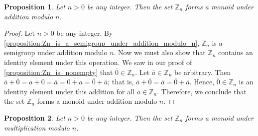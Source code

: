 \documentclass[12pt, titlepage]{amsart}
\newcommand\Z{{\mathbb Z}}
\newtheorem{prop}{Proposition}[subsection]
\theoremstyle{definition}
\begin{document}
	\begin{prop}\label{proposition:Zn_is_a_monoid_under_addition}
		Let $n>0$ be any integer. Then the set $\Z_n$ forms a monoid under addition modulo $n$.
	\end{prop}
	
	\begin{proof}
		Let $n>0$ be any integer.
		By \cref{proposition:Zn_is_a_semigroup_under_addition_modulo_n}, $\Z_n$ is a semigroup under addition modulo $n$.
		Now we must also show that $\Z_n$ contains an identity element under this operation.
		We saw in our proof of \cref{proposition:Zn_is_nonempty} that $\bar{0} \in \Z_n$.
		Let $\bar{a} \in \Z_n$ be arbitrary.
		Then $\bar{a} + \bar{0} = \overline{a + 0} = \bar{a} = \overline{0 + a} = \bar{0} + \bar{a}$; that is, $\bar{a} + \bar{0} =  \bar{a} = \bar{0} + \bar{a}$.
		Hence, $\bar{0} \in \Z_n$ is an identity element under this addition for all $\bar{a} \in \Z_n$.
		Therefore, we conclude that the set $\Z_n$ forms a monoid under addition modulo $n$.
	\end{proof}
		
	\begin{prop}\label{proposition:Zn_is_a_monoid_under_multiplication}
		Let $n>0$ be any integer. Then the set $\Z_n$ forms a monoid under multiplication modulo $n$.
	\end{prop}
	
\end{document}
